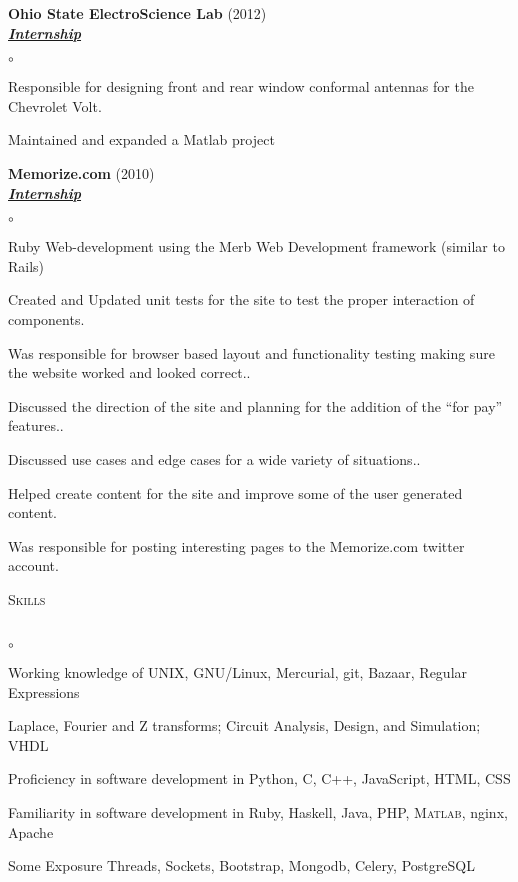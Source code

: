 \documentclass{article}
\newcommand{\lineunder}{\vspace*{-8pt} \\ \hspace*{-18pt} \hrulefill \\}
\newcommand{\header}[1]{{\hspace*{-15pt}\vspace*{6pt} \textsc{#1}} \vspace*{-6pt} \lineunder}
\newcommand{\employer}[3]{{ \textbf{#1} (#2)\\ \underline{\textbf{\emph{#3}}}\\  }}
\newenvironment{achievements}{\begin{list}{$\circ$}{\topsep 0pt \itemsep -2pt}}{\vspace*{4pt}\end{list}}
\begin{document}
\employer{Ohio State ElectroScience Lab}{2012}{Internship}
	\begin{achievements}
	\item Responsible for designing front and rear window conformal antennas for the Chevrolet Volt.
	\item Maintained and expanded a Matlab project
	\end{achievements}

\employer{Memorize.com}{2010}{Internship}
	\begin{achievements}
	\item Ruby Web-development using the Merb Web Development framework
(similar to Rails) 
	\item Created and Updated unit tests for the site to test the proper
interaction of components.
	\item Was responsible for browser based layout and functionality testing
making sure the website worked and looked correct..
	\item Discussed the direction of the site and planning
for the addition of the ``for pay'' features..
	\item Discussed use cases and edge cases for a wide variety of
situations..
	\item Helped create content for the site and improve some of the
	user generated content.
	\item Was responsible for posting interesting pages to the Memorize.com twitter
	account. 
	\end{achievements}

\header{Skills}
\begin{achievements}
	\item Working knowledge of UNIX, GNU/Linux, Mercurial, git, Bazaar, Regular Expressions
	\item Laplace, Fourier and Z transforms; Circuit Analysis, Design, and Simulation; VHDL
	\item Proficiency in software development in Python, C, C++, JavaScript, HTML, CSS
	\item Familiarity in software development in Ruby, Haskell, Java, PHP, \textsc{Matlab}, nginx, Apache
	\item Some Exposure Threads, Sockets, Bootstrap, Mongodb, Celery, PostgreSQL
\end{achievements}
\end{document}
